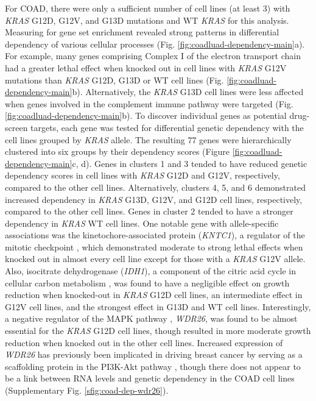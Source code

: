 \documentclass[english, 10pt, letterpaper]{article}
\newcommand{\KRAS}{\emph{KRAS}}
\begin{document}
For COAD, there were only a sufficient number of cell lines (at least 3) with \KRAS{} G12D, G12V, and G13D mutations and WT \KRAS{} for this analysis.
Measuring for gene set enrichment revealed strong patterns in differential dependency of various cellular processes (Fig. \ref{fig:coadluad-dependency-main}a).
For example, many genes comprising Complex I of the electron transport chain had a greater lethal effect when knocked out in cell lines with \KRAS{} G12V mutations than \KRAS{} G12D, G13D or WT cell lines (Fig. \ref{fig:coadluad-dependency-main}b).
Alternatively, the \KRAS{} G13D cell lines were less affected when genes involved in the complement immune pathway were targeted (Fig. \ref{fig:coadluad-dependency-main}b).
To discover individual genes as potential drug-screen targets, each gene was tested for differential genetic dependency with the cell lines grouped by \KRAS{} allele. 
The resulting 77 genes were hierarchically clustered into six groups by their dependency scores (Figure \ref{fig:coadluad-dependency-main}c, d).
Genes in clusters 1 and 3 tended to have reduced genetic dependency scores in cell lines with \KRAS{} G12D and G12V, respectively, compared to the other cell lines.
Alternatively, clusters 4, 5, and 6 demonstrated increased dependency in \KRAS{} G13D, G12V, and G12D cell lines, respectively, compared to the other cell lines.
Genes in cluster 2 tended to have a stronger dependency in \KRAS{} WT cell lines.
One notable gene with allele-specific associations was the kinetochore-associated protein (\emph{KNTC1}), a regulator of the mitotic checkpoint \cite{Chan2000HumanKinetochores., Scaerou2001TheKinetochore., Kops2005ZW10Kinetochore.}, which demonstrated moderate to strong lethal effects when knocked out in almost every cell line except for those with a \KRAS{} G12V allele.
Also, isocitrate dehydrogenase (\emph{IDH1}), a component of the citric acid cycle in cellular carbon metabolism \cite{Geisbrecht1999TheDehydrogenase.}, was found to have a negligible effect on growth reduction when knocked-out in \KRAS{} G12D cell lines, an intermediate effect in G12V cell lines, and the strongest effect in G13D and WT cell lines.
Interestingly, a negative regulator of the MAPK pathway \cite{Goto2016WDR26Pathway.}, \emph{WDR26}, was found to be almost essential for the \KRAS{} G12D cell lines, though resulted in more moderate growth reduction when knocked out in the other cell lines.
Increased expression of \emph{WDR26} has previously been implicated in driving breast cancer by serving as a scaffolding protein in the PI3K-Akt pathway \cite{Ye2016UpregulatedInvasion.}, though there does not appear to be a link between RNA levels and genetic dependency in the COAD cell lines (Supplementary Fig. \ref{sfig:coad-dep-wdr26}).
\end{document}

